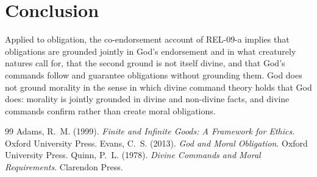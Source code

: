 \documentclass{situationist-preprint}
\begin{document}
\section{Conclusion}

Applied to obligation, the co-endorsement account of REL-09-a implies that obligations are grounded jointly in God's endorsement and in what creaturely natures call for, that the second ground is not itself divine, and that God's commands follow and guarantee obligations without grounding them. God does not ground morality in the sense in which divine command theory holds that God does: morality is jointly grounded in divine and non-divine facts, and divine commands confirm rather than create moral obligations.

\begin{thebibliography}{99}\small
{} Adams, R.~M. (1999). \emph{Finite and Infinite Goods: A Framework for Ethics}. Oxford University Press.
 Evans, C.~S. (2013). \emph{God and Moral Obligation}. Oxford University Press.
 Quinn, P.~L. (1978). \emph{Divine Commands and Moral Requirements}. Clarendon Press.
\end{thebibliography}
\end{document}
